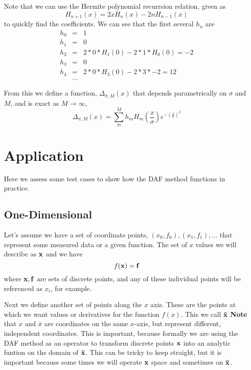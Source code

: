 \documentclass[preprint]{revtex4}
\begin{document}
Note that we can use the Hermite polynomial recurrsion relation, given as
\begin{equation}
\label{eqn_HermiteRecur}
H_{n+1}(x) = 2xH_n(x)-2nH_{n-1}(x)
\end{equation}
to quickly find the coefficients. We can see that the first several $h_n$  are
\begin{eqnarray}
h_0 & =&  1 \nonumber \\
h_1 &=& 0 \nonumber \\
h_2 &=& 2*0*H_1(0)-2*1*H_0(0) = -2 \nonumber \\
h_3 &=& 0 \nonumber \\
h_4 &=& 2*0*H_3(0) - 2*3*-2= 12 \nonumber \\
&...& \nonumber
\end{eqnarray}

From this we define a function, $\Delta_{\sigma,M}(x)$ that depends parametrically on
$\sigma$ and $M$, and is exact as $M\to\infty$, 
\begin{equation}
\label{eqn_DeltaExpansion}
\Delta_{\sigma,M}(x) = \sum_m^M h_m H_m \left(\frac{x}{\sigma}\right)e^{- \left(\frac{x}{\sigma}\right)^2}
\end{equation}


\section{Application}

Here we assess some test cases to show how the DAF method functions in practice. 


\subsection{One-Dimensional}

Let's assume we have a set of coordinate points, $(x_0,f_0),(x_1,f_1),...$ that represent
some measured data or a given function. The set of $x$ values we will describe as ${\bf x}$
and we have
\begin{equation*}
f({\bf x}) = {\bf f}
\end{equation*}
where ${\bf x, f}$ are sets of discrete points, and any of these individual points will
be referenced as $x_i$, for example. 

Next we define another set of points along the $x$ axis. These are the points at which
we want values or derivatives for the function $f(x)$. This we call ${\bf \bar{x}}$
{\bf Note} that $x$ and $\bar{x}$ are coordinates on the same $x$-axis, but represent
different, independent coordinates. This is important, because formally we are using
the DAF method as an operator to transform discrete points $\bf{x}$ into an analytic
funtion on the domain of $\bf{\bar{x}}$. This can be tricky to keep straight, but it
is important because some times we will operate $\bf{x}$ space and sometimes on $\bf{\bar{x}}$. 
\end{document}
